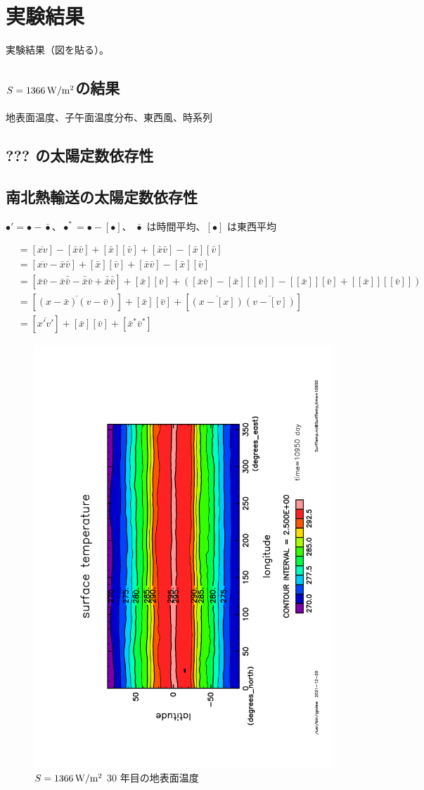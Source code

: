 \documentclass[body]{subfiles}
\begin{document}
\chapter{実験結果}

実験結果（図を貼る）。

\section{\(S=1366\hmu{W/m^2}\)の結果}
地表面温度、子午面温度分布、東西風、時系列

\section{??? の太陽定数依存性}

\section{南北熱輸送の太陽定数依存性}

\(\bullet'=\bullet-\bar\bullet\)、\(\bullet^*=\bullet-[\bullet]\)、
\(\bar\bullet\) は時間平均、\([\bullet]\) は東西平均

\begin{align*}
	[\overline{xv}]&=[\overline{xv}]-[\bar x\bar v]+[\bar x][\bar v]+[\bar x\bar v]-[\bar x][\bar v]\\
	&=[\overline{xv}-\bar x\bar v]+[\bar x][\bar v]+[\bar x\bar v]-[\bar x][\bar v]\\
	&=[\bar x\bar v-\bar x\bar\bar v-\bar\bar x\bar v+\bar\bar x\bar\bar v]+[\bar x][\bar v]
		+([\bar x\bar v]-[\bar x][[\bar v]]-[[\bar x]][\bar v]+[[\bar x]][[\bar v]])\\
	&=[\overline{(x-\bar x)(v-\bar v)}]+[\bar x][\bar v]+[\overline{(x-[x])}\overline{(v-[v])}]\\
	&=[\overline{x'v'}]+[\bar x][\bar v]+[\bar x^*\bar v^*]
\end{align*}

\begin{figure}[t]
	\includegraphics[height=\textwidth,angle=-90]{S1366SurfTemp,time=10950.pdf}
	\caption{\(S=1366\hmu{W/m^2}\) 30 年目の地表面温度}
\end{figure}
\end{document}
